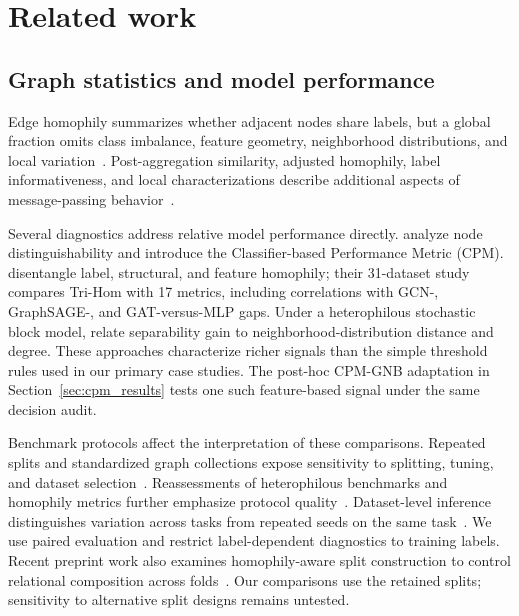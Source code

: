 \section{Related work}
\label{sec:related}



\subsection{Graph statistics and model performance}

Edge homophily summarizes whether adjacent nodes share labels, but a global fraction omits class imbalance, feature geometry, neighborhood distributions, and local variation~\citep{mcpherson2001homophily,zhu2020beyond,ma2021homophily}. Post-aggregation similarity, adjusted homophily, label informativeness, and local characterizations describe additional aspects of message-passing behavior~\citep{luan2022linkx,platonov2023characterizing,loveland2024local}.

Several diagnostics address relative model performance directly. \citet{luan2023whendo} analyze node distinguishability and introduce the Classifier-based Performance Metric (CPM). \citet{zheng2024trihom} disentangle label, structural, and feature homophily; their 31-dataset study compares Tri-Hom with 17 metrics, including correlations with GCN-, GraphSAGE-, and GAT-versus-MLP gaps. Under a heterophilous stochastic block model, \citet{pmlr-v235-wang24u} relate separability gain to neighborhood-distribution distance and degree. These approaches characterize richer signals than the simple threshold rules used in our primary case studies. The post-hoc CPM-GNB adaptation in Section~\ref{sec:cpm_results} tests one such feature-based signal under the same decision audit.

Benchmark protocols affect the interpretation of these comparisons. Repeated splits and standardized graph collections expose sensitivity to splitting, tuning, and dataset selection~\citep{shchur2018pitfalls,hu2020ogb}. Reassessments of heterophilous benchmarks and homophily metrics further emphasize protocol quality~\citep{platonov2023heterophilous,luan2024reevaluating}. Dataset-level inference distinguishes variation across tasks from repeated seeds on the same task~\citep{demsar2006statistical}. We use paired evaluation and restrict label-dependent diagnostics to training labels. Recent preprint work also examines homophily-aware split construction to control relational composition across folds~\citep{jami2026stratification}. Our comparisons use the retained splits; sensitivity to alternative split designs remains untested.

